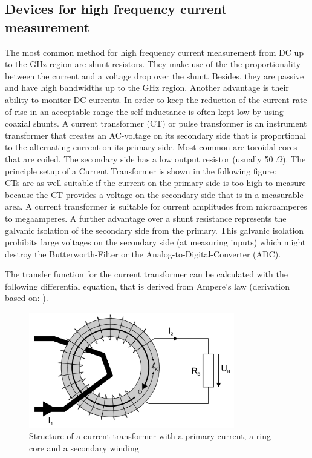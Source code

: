 \subsection{Devices for high frequency current measurement}
The most common method for high frequency current measurement from DC up to the GHz region are shunt resistors. They make use of the the proportionality between the current and a voltage drop over the shunt. Besides, they are passive and have high bandwidths up to the GHz region. Another advantage is their ability to monitor DC currents. In order to keep the reduction of the current rate of rise in an acceptable range the self-inductance is often kept low by using coaxial shunts. \cite{highdynamiccurrent}
A current transformer (CT) or pulse transformer is an instrument transformer that creates an AC-voltage on its secondary side that is proportional to the alternating current on its primary side. Most common are toroidal cores that are coiled. The secondary side has a low output resistor (usually 50 $\Omega$).
The principle setup of a Current Transformer is shown in the following figure: 
\\CTs are as well suitable if the current on the primary side is too high to measure because the CT provides a voltage on the secondary side that is in a measurable area. A current transformer is suitable for current amplitudes from microamperes to megaamperes. A further advantage over a shunt resistance represents the galvanic isolation of the secondary side from the primary. This galvanic isolation prohibits large voltages on the secondary side (at measuring inputs) which might destroy the Butterworth-Filter or the Analog-to-Digital-Converter (ADC). 

The transfer function for the current transformer can be calculated with the following differential equation, that is derived from Ampere's law (derivation based on: \cite{highdynamiccurrent}).\\
\begin{figure}
	\includegraphics[width=0.8\textwidth]{figures/Theory/ct_setup}
	\caption[Kurze Abbildungsbeschreibung]{Structure of a current transformer with a primary current, a ring core and a secondary winding \protect\footnotemark}
	\label{fig.ct_setup}
\end{figure}

